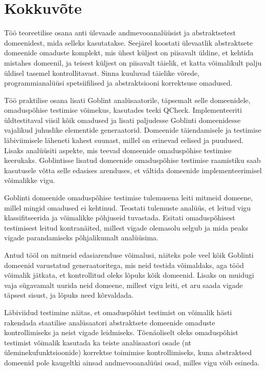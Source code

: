 \documentclass[../thesis.tex]{subfiles}
\begin{document}
\section{Kokkuvõte}
Töö teoreetilise osana anti ülevaade andmevooanalüüsist ja abstraktsetest domeenidest, mida selleks kasutatakse. Seejärel koostati ülevaatlik abstraktsete domeenide omaduste komplekt, mis ühest küljest on piisavalt üldine, et kehtida mistahes domeenil, ja teisest küljest on piisavalt täielik, et katta võimalikult palju üldisel tasemel kontrollitavast. Sinna kuuluvad täielike võrede, programmianalüüsi spetsiifilised ja abstraktsiooni korrektsuse omadused.

Töö praktilise osana lisati Goblint analüsaatorile, täpsemalt selle domeenidele, omaduspõhise testimise võimekus, kasutades teeki QCheck. Implementeeriti üldtestitaval viisil kõik omadused ja lisati paljudesse Goblinti domeenidesse vajalikud juhuslike elementide generaatorid. Domeenide täiendamisele ja testimise läbiviimisele läheneti kahest suunast, millel on erinevad eelised ja puudused. Lisaks analüüsiti aspekte, mis teevad domeenide omaduspõhise testimise keerukaks. Goblintisse lisatud domeenide omaduspõhise testimise raamistiku saab kasutusele võtta selle edasises arenduses, et vältida domeenide implementeerimisel võimalikke vigu.

Goblinti domeenide omaduspõhise testimise tulemusena leiti mitmeid domeene, millel mingid omadused ei kehtinud. Teostati tulemuste analüüs, et leitud vigu klassifitseerida ja võimalikke põhjuseid tuvastada. Esitati omaduspõhisest testimisest leitud kontranäited, millest vigade olemasolu selgub ja mida peaks vigade parandamiseks põhjalikumalt analüüsima.

Antud tööl on mitmeid edasiarenduse võimalusi, näiteks pole veel kõik Goblinti domeenid varustatud generaatoritega, mis neid testida võimaldaks, aga tööd võimalik jätkata, et kontrollitud oleks lõpuks kõik domeenid. Lisaks on muidugi vaja sügavamalt uurida neid domeene, millest vigu leiti, et aru saada vigade täpsest sisust, ja lõpuks need kõrvaldada.

Läbiviidud testimine näitas, et omaduspõhist testimist on võimalik hästi rakendada staatilise analüsaatori abstraktsete domeenide omaduste kontrollimiseks ja neist vigade leidmiseks. Tõenäoliselt oleks omaduspõhist testimist võimalik kasutada ka teiste analüsaatori osade (nt üleminekufunktsioonide) korrektse toimimise kontrollimiseks, kuna abstraktsed domeenid pole kaugeltki ainsad andmevooanalüüsi osad, milles vigu võib esineda.
\end{document}
